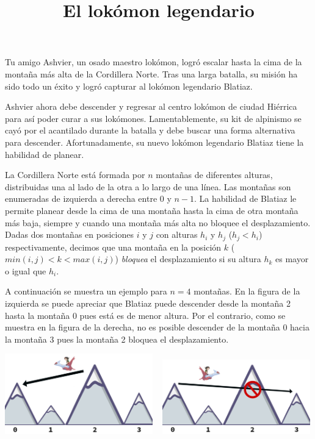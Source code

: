 \documentclass{oci}
\title{El lokómon legendario}
\begin{document}
\begin{problemDescription}

Tu amigo Ashvier, un osado maestro lokómon, logró escalar hasta la cima de la montaña más alta de
la Cordillera Norte.
Tras una larga batalla, su misión ha sido todo un éxito y logró capturar al lokómon legendario Blatiaz.

Ashvier ahora debe descender y regresar al centro lokómon de ciudad Hiérrica para así poder curar
a sus lokómones.
Lamentablemente, su kit de alpinismo se cayó por el acantilado durante la batalla y debe buscar
una forma alternativa para descender.
Afortunadamente, su nuevo lokómon legendario Blatiaz tiene la habilidad de planear.

La Cordillera Norte está formada por $n$ montañas de diferentes alturas, distribuidas una al lado
de la otra a lo largo de una línea.
Las montañas son enumeradas de izquierda a derecha entre 0 y $n-1$.
La habilidad de Blatiaz le permite planear desde la cima de una montaña
hasta la cima de otra montaña más baja, siempre y cuando una montaña más alta no bloquee
el desplazamiento.
Dadas dos montañas en posiciones $i$ y $j$ con alturas $h_i$ y $h_j$ ($h_j < h_i$) respectivamente,
decimos que una montaña en la posición $k$ ($min(i, j) < k < max(i, j)$) \emph{bloquea} el
desplazamiento si su altura $h_k$ es mayor o igual que $h_i$.


A continuación se muestra un ejemplo para $n=4$ montañas.
En la figura de la izquierda se puede apreciar que Blatiaz puede descender desde la montaña 2
hasta la montaña 0 pues está es de menor altura.
Por el contrario, como se muestra en la figura de la derecha, no es posible descender de la
montaña 0 hacia la montaña 3 pues la montaña 2 bloquea el desplazamiento.

\begin{center}
\includegraphics[width=0.48\textwidth]{allowed.png}
~
\includegraphics[width=0.48\textwidth]{disallowed.png}
\end{center}


\end{problemDescription}
\end{document}

